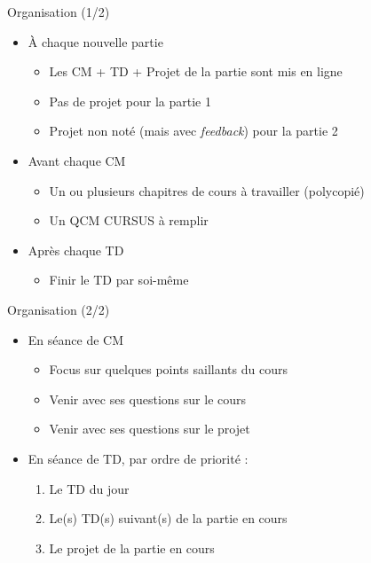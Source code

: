 \documentclass[10pt]{beamer}
\begin{document}
\begin{frame}{Organisation (1/2)}  
  \begin{itemize}
    \item À chaque nouvelle partie
    \begin{itemize}
      \item Les CM + TD + Projet de la partie sont mis en ligne
      \item Pas de projet pour la partie 1
      \item Projet non noté (mais avec \emph{feedback}) pour la partie 2
    \end{itemize}
    \item Avant chaque CM
    \begin{itemize}
      \item Un ou plusieurs chapitres de cours à travailler (polycopié)
      \item Un QCM CURSUS à remplir
    \end{itemize}
    \item Après chaque TD
    \begin{itemize}
      \item Finir le TD par soi-même
    \end{itemize}
  \end{itemize}
\end{frame}

\begin{frame}{Organisation (2/2)}  
  \begin{itemize}
    \item En séance de CM
    \begin{itemize}
      \item Focus sur quelques points saillants du cours
      \item Venir avec ses questions sur le cours
      \item Venir avec ses questions sur le projet
    \end{itemize}
    \item En séance de TD, par ordre de priorité :
    \begin{enumerate}
      \item Le TD du jour
      \item Le(s) TD(s) suivant(s) de la partie en cours
      \item Le projet de la partie en cours
    \end{enumerate}
  \end{itemize}
\end{frame}
\end{document}
